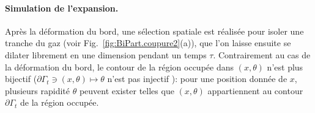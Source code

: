%
%
%
%
%
%
%
%
%

\paragraph{Simulation de l’expansion.}

Après la déformation du bord, une sélection spatiale est réalisée pour isoler une tranche du gaz (voir Fig.~\ref{fig:BiPart.coupure2}(a)), que l’on laisse ensuite se dilater librement en une dimension pendant un temps \(\tau\). Contrairement au cas de la déformation du bord, le contour de la région occupée dans $(x,\theta)$ n’est plus bijectif ($\partial \Gamma_t \ni (x,\theta) \mapsto \theta $ n'est pas injectif ): pour une position donnée de $x$, plusieurs rapidité $\theta$ peuvent exister telles que $(x,\theta)$ appartiennent au contour $\partial \Gamma_t$ de la région occupée.

